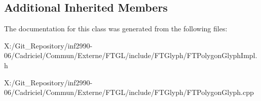 \subsection*{Additional Inherited Members}


The documentation for this class was generated from the following files\-:\begin{DoxyCompactItemize}
\item 
X\-:/\-Git\-\_\-\-Repository/inf2990-\/06/\-Cadriciel/\-Commun/\-Externe/\-F\-T\-G\-L/include/\-F\-T\-Glyph/F\-T\-Polygon\-Glyph\-Impl.\-h\item 
X\-:/\-Git\-\_\-\-Repository/inf2990-\/06/\-Cadriciel/\-Commun/\-Externe/\-F\-T\-G\-L/include/\-F\-T\-Glyph/F\-T\-Polygon\-Glyph.\-cpp\end{DoxyCompactItemize}

